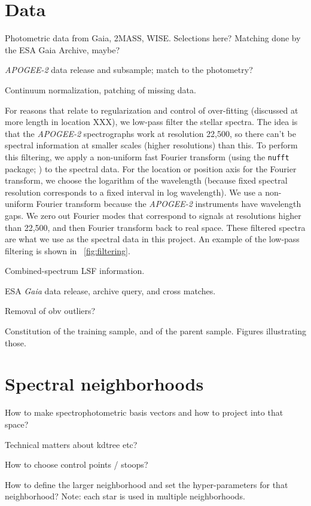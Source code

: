 \documentclass[modern]{aastex631}
\newcommand{\acronym}[1]{{\small{#1}}}
\newcommand{\project}[1]{\textsl{#1}}
\newcommand{\ESA}{\acronym{ESA}}
\newcommand{\Gaia}{\project{Gaia}}
\newcommand{\APOGEE}{\project{\acronym{APOGEE-2}}}
\newcommand{\code}[1]{\texttt{#1}}
\begin{document}
\section{Data}

Photometric data from Gaia, 2MASS, WISE. Selections here? Matching done by
the ESA Gaia Archive, maybe?

\APOGEE{} data release and subsample; match to the photometry?

Continuum normalization, patching of missing data.

For reasons that relate to regularization and control of over-fitting (discussed
at more length in location XXX), we low-pass filter the stellar spectra.
The idea is that the \APOGEE{} spectrographs work at resolution 22,500, so there
can't be spectral information at smaller scales (higher resolutions) than this.
To perform this filtering, we apply a non-uniform fast Fourier transform (using
the \code{nufft} package; \citealt{nufft}) to the spectral data.
For the location or position axis for the Fourier transform,
we choose the logarithm of the wavelength (because fixed spectral resolution
corresponds to a fixed interval in log wavelength).
We use a non-uniform Fourier transform because the \APOGEE{} instruments have
wavelength gaps.
We zero out Fourier modes that correspond to signals at resolutions higher than
22,500, and then Fourier transform back to real space.
These filtered spectra are what we use as the spectral data in this project.
An example of the low-pass filtering is shown in \figurename~\ref{fig:filtering}.

Combined-spectrum LSF information.

\ESA{} \Gaia{} data release, archive query, and cross matches.

Removal of obv outliers?

Constitution of the training sample, and of the parent sample. Figures illustrating those.

\section{Spectral neighborhoods}

How to make spectrophotometric basis vectors and how to project into that space?

Technical matters about kdtree etc?

How to choose control points / stoops?

How to define the larger neighborhood and set the hyper-parameters for that neighborhood? Note: each star is used in multiple neighborhoods.
\end{document}
